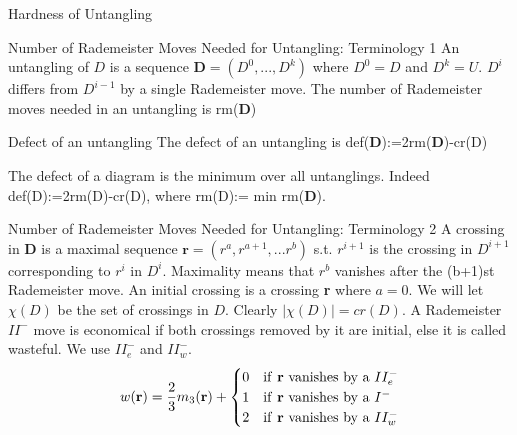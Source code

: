 \documentclass{beamer}
\begin{document}
\iffalse
\begin{section}{Hardness of Untangling} 
    
    \begin{frame}{Number of Rademeister Moves Needed for Untangling: Terminology 1}
        An untangling of $D$ is a sequence $\mathbf{D}=(D^0,...,D^k)$  where $D^0=D$ and $D^k=U$. $D^i$ differs from $D^{i-1}$ by a single Rademeister move. 
        \newline
        \newline
        The number of Rademeister moves needed in an untangling is rm(\textbf{D})
        
        \begin{block}{Defect of an untangling}
            The defect of an untangling is def(\textbf{D}):=2rm(\textbf{D})-cr(D)
        \end{block}{}
        \newline
        \newline
        The defect of a diagram is the minimum over all untanglings. Indeed def(D):=2rm(D)-cr(D), where rm(D):= min rm(\textbf{D}). 
     \end{frame}
     
    \begin{frame}{Number of Rademeister Moves Needed for Untangling: Terminology 2}
        A crossing in \textbf{D} is a maximal sequence $\mathbf{r}=(r^a,r^{a+1},...r^b)$ s.t. $r^{i+1}$ is the crossing in $D^{i+1}$ corresponding to $r^i$ in $D^i$. Maximality means that $r^b$ vanishes after the (b+1)st Rademeister move.
        \newline
        \newline
        An initial crossing is a crossing \textbf{r} where $a=0$. We will let $\chi(D)$ be the set of crossings in $D$. Clearly $|\chi(D)|=cr(D)$.  
        \newline
        \newline
        A Rademeister $II^-$ move is economical if both crossings removed by it are initial, else it is called wasteful. We use $II^-_e$ and $II^-_w$. 
        \newline
        \newline
        \[ 
            w(\mathbf{r}) = \frac{2}{3}m_3(\textbf{r})+ \begin{cases}{}
            0 & \text{if \textbf{r} vanishes by a } II^-_e \\
            1 & \text{if \textbf{r} vanishes by a } I^- \\
            2 & \text{if \textbf{r} vanishes by a } II^-_w
            

\end{cases}\]
\end{frame}
\end{section}
\end{document}

